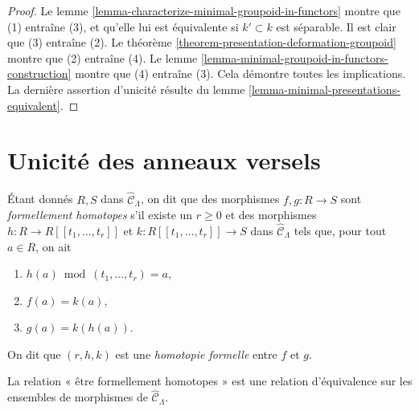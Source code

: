 \begin{proof}
Le lemme \ref{lemma-characterize-minimal-groupoid-in-functors} montre que (1)
entraîne (3), et qu'elle lui est équivalente si $k' \subset k$ est séparable.
Il est clair que (3) entraîne (2). Le théorème
\ref{theorem-presentation-deformation-groupoid} montre que (2) entraîne (4).
Le lemme \ref{lemma-minimal-groupoid-in-functors-construction} montre que (4)
entraîne (3). Cela démontre toutes les implications. La dernière assertion
d'unicité résulte du lemme \ref{lemma-minimal-presentations-equivalent}.
\end{proof}








\section{Unicité des anneaux versels}
\label{section-uniqueness}

\noindent
Étant donnés $R, S$ dans $\widehat{\mathcal{C}}_\Lambda$, on dit que des
morphismes $f, g : R \to S$ sont {\it formellement homotopes} s'il existe un
$r \geq 0$ et des morphismes $h : R \to R[[t_1, \ldots, t_r]]$ et
$k : R[[t_1, \ldots, t_r]] \to S$ dans $\widehat{\mathcal{C}}_\Lambda$ tels
que, pour tout $a \in R$, on ait
\begin{enumerate}
\item $h(a) \bmod (t_1, \ldots, t_r) = a$,
\item $f(a) = k(a)$,
\item $g(a) = k(h(a))$.
\end{enumerate}
On dit que $(r, h, k)$ est une {\it homotopie formelle} entre $f$ et $g$.

\begin{lemma}
\label{lemma-homotopy}
La relation « être formellement homotopes » est une relation d'équivalence sur
les ensembles de morphismes de $\widehat{\mathcal{C}}_\Lambda$.
\end{lemma}


